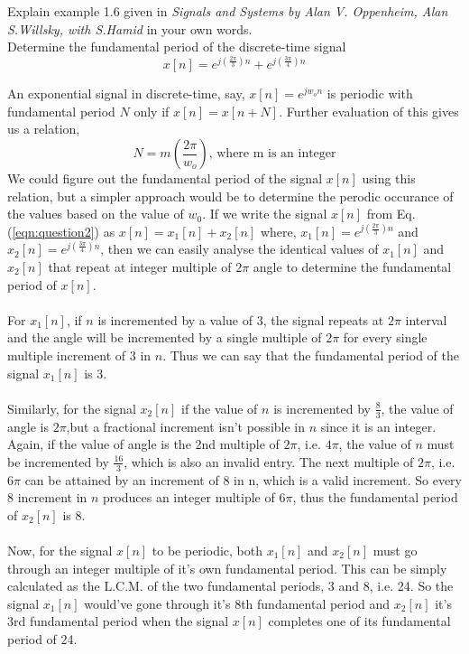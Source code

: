 \documentclass{article}[12 pt]
\begin{document}
\begin{problem}{Explain example 1.6 given in \textit{Signals and Systems by Alan V. Oppenheim, Alan S.Willsky, with S.Hamid} in your own words.\\Determine the fundamental period of the discrete-time signal\begin{equation}
\label{eqn:question2}
x[n]=e^{j(\frac{2 \pi}{3})n}+e^{j(\frac{3 \pi}{4})n}
\end{equation}
}
\end{problem}
\begin{solution}{An exponential signal in discrete-time, say, $x[n]=e^{jw_o n}$ is periodic with fundamental period $N$ only if $x[n]=x[n+N]$. Further evaluation of this gives us a relation,
\begin{equation*}
N=m\left(\frac{2\pi}{w_o}\right)\text{, where m is an integer}
\end{equation*}
We could figure out the fundamental period of the signal $x[n]$ using this relation, but a simpler approach would be to determine the perodic occurance of the values based on the value of $w_0$. If we write the signal $x[n]$ from Eq.(\ref{eqn:question2}) as $x[n]=x_1[n]+x_2[n]$ where, $x_1[n]=e^{j(\frac{2 \pi}{3})n}$ and $x_2[n]=e^{j(\frac{3 \pi}{4})n}$, then we can easily analyse the identical values of $x_1[n]$ and $x_2[n]$ that repeat at integer multiple of $2\pi$ angle to determine the fundamental period of $x[n]$.\\\\For $x_1[n]$, if $n$ is incremented by a value of 3, the signal repeats at $2\pi$ interval and the angle will be incremented by a single multiple of $2\pi$ for every single multiple increment of 3 in $n$. Thus we can say that the fundamental period of the signal $x_1[n]$ is 3.\\\\Similarly, for the signal $x_2[n]$ if the value of $n$ is incremented by $\frac{8}{3}$, the value of angle is $2\pi$,but a fractional increment isn't possible in $n$ since it is an integer. Again, if the value of angle is the 2nd multiple of $2 \pi$, i.e. $4 \pi$, the value of $n$ must be incremented by $\frac{16}{3}$, which is also an invalid entry. The next multiple of $2\pi$, i.e. $6\pi$ can be attained by an increment of 8 in n, which is a valid increment. So every 8 increment in $n$ produces an integer multiple of $6\pi$, thus the fundamental period of $x_2[n]$ is 8.\\\\Now, for the signal $x[n]$ to be periodic, both $x_1[n]$ and $x_2[n]$ must go through an integer multiple of it's own fundamental period. This can be simply calculated as the L.C.M. of the two fundamental periods, 3 and 8, i.e.  24. So the signal $x_1[n]$ would've gone through it's 8th fundamental period and $x_2[n]$ it's 3rd fundamental period when the signal $x[n]$ completes one of its fundamental period of 24.}
\end{solution}
\end{document}
